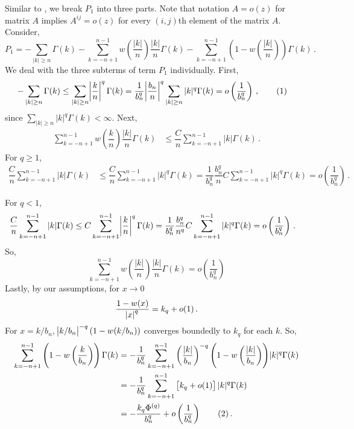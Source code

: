 \documentclass[11pt]{article}
\newcommand\numberthis{\addtocounter{equation}{1}\tag{\theequation}}
\theoremstyle{remark}
\begin{document}
%
Similar to \cite{hannan2009multiple}, we break $P_1$ into three parts. Note that notation $A = o(z)$ for matrix $A$  implies $A^{ij} = o(z)$ for every $(i,j)$th element of the matrix $A$. Consider,
\begin{equation}
\label{eq:P1_decomp}
P_1 = -\sum_{|k|\geq n}\Gamma(k)  -  \sum_{k = -n+1}^{n-1}w\left(\dfrac{|k|}{n}\right)\dfrac{|k|}{n}\Gamma(k)- \sum_{k = -n+1}^{n-1}\left(1-w\left(\dfrac{|k|}{n}\right)\right)\Gamma(k)\,.  
\end{equation}
%
We deal with the three subterms of term $P_1$ individually. First,
%    
\begin{align*}
 {-\sum_{|k|\geq n}\Gamma(k)} &\leq  \sum_{|k|\geq n} \abs{\dfrac{k}{n}}^q   \Gamma(k) = \dfrac{1}{b_n^q}\abs{\dfrac{b_n}{n}}^q \sum_{|k|\geq n}|k|^q  \Gamma(k) = o\left(\dfrac{1}{b_n^q}\right)\,, \numberthis \label{eq:P1_first}
\end{align*}
%
since $\sum_{|k|\geq n}|k|^q \Gamma(k)  < \infty$. Next,
%
\begin{align*}
 \sum_{k = -n+1}^{n-1}w\left(\dfrac{k}{n}\right)\dfrac{|k|}{n}\Gamma(k)   &\leq \dfrac{C}{n}\sum_{k = -n+1}^{n-1}|k|  \Gamma(k)  \,.
\end{align*}
For $q\geq 1$,
\begin{align*}
\dfrac{C}{n}\sum_{k = -n+1}^{n-1}|k|  \Gamma(k) &\leq \dfrac{C}{n}\sum_{k = -n+1}^{n-1}|k|^q  \Gamma(k) = \dfrac{1}{b_n^q}\dfrac{b_n^q}{n} C\sum_{k = -n+1}^{n-1}|k|^q  \Gamma(k)  = o\left(\dfrac{1}{b_n^q}\right)\,.
\end{align*}
          
For $q <1$,
\begin{align*}
   \dfrac{C}{n}\sum_{k = -n+1}^{n-1}|k|  \Gamma(k)  &\leq C\sum_{k =-n+1}^{n-1}\abs{\dfrac{k}{n}}^q  \Gamma(k)  = \dfrac{1}{b_n^q}\dfrac{b_n^q}{n^q} C \sum_{k =-n+1}^{n-1}|k|^q \Gamma(k)  = o\left(\dfrac{1}{b_n^q}\right) \, .
\end{align*}
So,
\begin{equation}
\label{eq:P1_second}
 \sum_{k = -n+1}^{n-1}w\left(\dfrac{|k|}{n}\right)\dfrac{|k|}{n}\Gamma(k) = o \left(\dfrac{1}{b_n^q} \right)
\end{equation}
Lastly, by our assumptions, for $x \to 0$
\[
\dfrac{1 - w(x)}{\abs{x}^q} = k_q + o(1)\,.
\]
For $x = k/b_n$, $\abs{k/b_n}^{-q}(1-w(k/b_n))$ converges boundedly to $k_q$ for each $k$.
So,
\begin{align*}
     \sum_{k = -n+1}^{n-1}\left(1-w\left(\dfrac{k}{b_n}\right)\right)\Gamma(k) &= -\dfrac{1}{b_n^q}\sum_{k = -n+1}^{n-1}  \left(\dfrac{|k|}{b_n}\right)^{-q} {\left(1-w\left(\dfrac{|k|}{b_n}\right)\right)}|k|^q \Gamma(k) \\
     & = -\dfrac{1}{b_n^q}\sum_{k = -n+1}^{n-1}   \left[k_q + o(1) \right]|k|^q \Gamma(k) \\
     & = -\dfrac{k_q \Phi^{(q)} }{b_n^q} + o\left( \dfrac{1}{b_n^q} \right) \numberthis \label{eq:P1_third}\,.
\end{align*}
\end{document}
